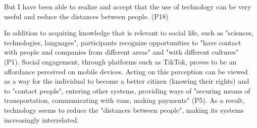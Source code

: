 But I have been able to realize and accept that the use of technology
can be very useful and reduce the distances between people. (P18)

In addition to acquiring knowledge that is relevant to social life, such
as "sciences, technologies, languages", participants recognize
opportunities to "have contact with people and companies from different
areas" and "with different cultures" (P1). Social engagement, through
platforms such as TikTok, proves to be an affordance perceived on mobile
devices. Acting on this perception can be viewed as a way for the
individual to become a better citizen (knowing their rights) and to
"contact people", entering other systems, providing ways of "securing
means of transportation, communicating with vans, making payments" (P5).
As a result, technology seems to reduce the "distances between people",
making its systems increasingly interrelated.
